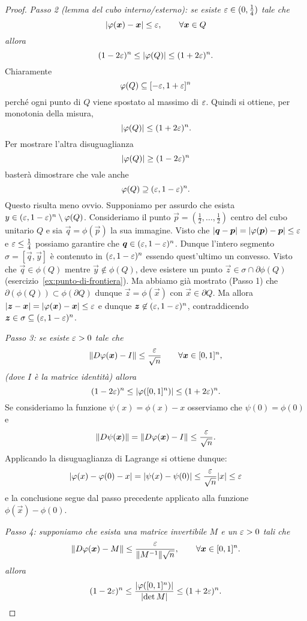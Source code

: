 \begin{proof}
\emph{Passo 2 (lemma del cubo interno/esterno): 
se esiste $\varepsilon\in(0,\frac 1 4)$ tale che 
\[
  {\left|\varphi(\boldsymbol x)-\boldsymbol x\right|} \le \varepsilon, \qquad \forall \boldsymbol x \in Q
\]
allora }
\[
  (1-2\varepsilon)^n
  \le {\left|\varphi(Q)\right|}
  \le (1+2\varepsilon)^n.
\]
Chiaramente 
\[
    \varphi(Q) \subseteq [-\varepsilon,1+\varepsilon]^n
\]
perché ogni punto di $Q$ viene spostato al massimo di $\varepsilon$. 
Quindi si ottiene, per monotonia della misura,
\[
    {\left|\varphi(Q)\right|} \le (1+2\varepsilon)^n.
\]
Per mostrare l'altra disuguaglianza  
\[
   {\left|\varphi(Q)\right|} \ge (1-2\varepsilon)^n
\]
basterà dimostrare che vale anche 
\[
  \varphi(Q) \supseteq (\varepsilon,1-\varepsilon)^n.
\]
Questo risulta meno ovvio.
Supponiamo per assurdo che esista $y \in (\varepsilon,1-\varepsilon)^n \setminus \varphi(Q)$.
Consideriamo il punto $\vec p=(\frac 12, \dots, \frac 12)$ centro 
del cubo unitario $Q$ e sia $\vec q=\phi(\vec p)$ la sua immagine. 
Visto che ${\left|\boldsymbol q-\boldsymbol p\right|} = {\left|\varphi(\boldsymbol p)-\boldsymbol p\right|} \le \varepsilon$ 
e $\varepsilon \le \frac 1 4$ possiamo garantire che
$\boldsymbol q \in (\varepsilon,1-\varepsilon)^n$.
Dunque l'intero segmento $\sigma = [\vec q,\vec y]$ è contenuto 
in $(\varepsilon,1-\varepsilon)^n$ essendo quest'ultimo un convesso.
Visto che $\vec q\in \phi(Q)$ mentre $\vec y \notin \phi(Q)$,
deve esistere un punto $\vec z\in \sigma\cap \partial \phi(Q)$
(esercizio~\ref{ex:punto-di-frontiera}).
Ma abbiamo già mostrato (Passo 1) che $\partial (\phi(Q)) \subset \phi(\partial Q)$
dunque $\vec z=\phi(\vec x)$ con $\vec x \in \partial Q$. 
Ma allora ${\left|\boldsymbol z-\boldsymbol x\right|} = {\left|\varphi(\boldsymbol x)- \boldsymbol x\right|} \le \varepsilon$ 
e dunque $\boldsymbol z\not \in (\varepsilon,1-\varepsilon)^n$, 
contraddicendo $\boldsymbol z \in \sigma \subseteq (\varepsilon,1-\varepsilon)^n$.

\emph{Passo 3: se esiste $\varepsilon>0$ tale che 
\[
  {\left\Vert  D\varphi(\boldsymbol x) - I\right\Vert} \le \frac{\varepsilon}{\sqrt n} \qquad \forall \boldsymbol x \in [0,1]^n,
\]
(dove $I$ è la matrice identità)
allora
\[
 (1-2\varepsilon)^n \le {\left|\varphi([0,1]^n)\right|} \le (1+2\varepsilon)^n.
\]
}
Se consideriamo la funzione $\psi(x) = \phi(x) - x$ osserviamo che $\psi(0)=\phi(0)$ e
\[
{\left\Vert D\psi(\boldsymbol x)\right\Vert} = {\left\Vert D\varphi(\boldsymbol x) -I\right\Vert} \le \frac{\varepsilon}{\sqrt n}.
\]
Applicando la disuguaglianza di Lagrange si ottiene dunque:
\[
{\left|\varphi(x) - \varphi(0) - x\right|} = {\left|\psi(x)-\psi(0)\right|} \le \frac {\varepsilon} {\sqrt n} {\left|x\right|} \le \varepsilon
\]
e la conclusione segue dal passo precedente applicato alla funzione $\phi(\vec x) - \phi(0)$.

\emph{Passo 4: supponiamo che esista una matrice invertibile $M$ e un $\varepsilon>0$ tali che
\[
  {\left\Vert D\varphi(\boldsymbol x) - M\right\Vert} \le \frac{\varepsilon}{{\left\Vert M^{-1}\right\Vert} \sqrt n}, \qquad \forall \boldsymbol x \in [0,1]^n.
\]
allora
\[
(1-2\varepsilon)^n \le \frac{{\left|\varphi([0,1]^n)\right|}}{{\left|\det M\right|}} \le (1+2\varepsilon)^n.
\]}


\end{proof}

